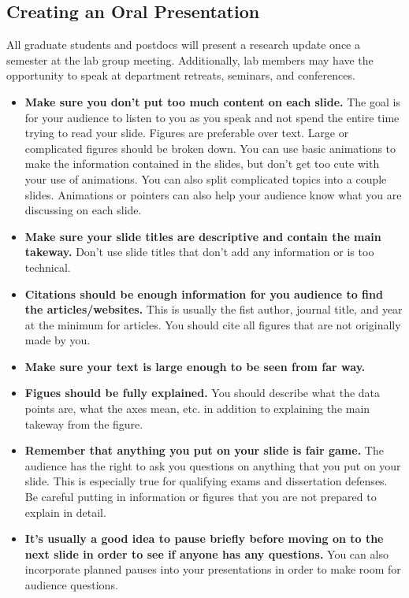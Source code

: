 \documentclass[
]{book}
\begin{document}
\hypertarget{oralpres}{%
\subsection{Creating an Oral Presentation}\label{oralpres}}

All graduate students and postdocs will present a research update once a semester at the lab group meeting. Additionally, lab members may have the opportunity to speak at department retreats, seminars, and conferences.

\begin{itemize}
\item
  \textbf{Make sure you don't put too much content on each slide.} The goal is for your audience to listen to you as you speak and not spend the entire time trying to read your slide. Figures are preferable over text. Large or complicated figures should be broken down. You can use basic animations to make the information contained in the slides, but don't get too cute with your use of animations. You can also split complicated topics into a couple slides. Animations or pointers can also help your audience know what you are discussing on each slide.
\item
  \textbf{Make sure your slide titles are descriptive and contain the main takeway.} Don't use slide titles that don't add any information or is too technical.
\item
  \textbf{Citations should be enough information for you audience to find the articles/websites.} This is usually the fist author, journal title, and year at the minimum for articles. You should cite all figures that are not originally made by you.
\item
  \textbf{Make sure your text is large enough to be seen from far way.}
\item
  \textbf{Figues should be fully explained.} You should describe what the data points are, what the axes mean, etc. in addition to explaining the main takeway from the figure.
\item
  \textbf{Remember that anything you put on your slide is fair game.} The audience has the right to ask you questions on anything that you put on your slide. This is especially true for qualifying exams and dissertation defenses. Be careful putting in information or figures that you are not prepared to explain in detail.
\item
  \textbf{It's usually a good idea to pause briefly before moving on to the next slide in order to see if anyone has any questions.} You can also incorporate planned pauses into your presentations in order to make room for audience questions.

\end{itemize}
\end{document}
